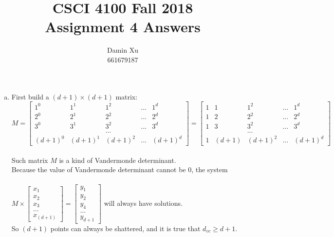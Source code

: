 \documentclass[11pt]{article}
\title{CSCI 4100 Fall 2018 \\
Assignment 4 Answers}
\author{Damin Xu\\661679187}
\begin{document}
\maketitle
\begin{enumerate} [(a)]
	\item First build a $(d+1)\times(d+1)$ matrix:\\
	$M = \begin{bmatrix}
		1^0 & 1^1 & 1^2 & ... & 1^d \\
		2^0 & 2^1 & 2^2 & ... & 2^d \\
		3^0 & 3^1 & 3^2 & ... & 3^d \\
		 &  & ... &  &  \\
		(d+1)^0 & (d+1)^1 & (d+1)^2 & ... & (d+1)^d 
	\end{bmatrix} =
	 \begin{bmatrix}
		1 & 1 & 1^2 & ... & 1^d \\
		1 & 2 & 2^2 & ... & 2^d \\
		1 & 3 & 3^2 & ... & 3^d \\
		 &  & ... &  &  \\
		1 & (d+1) & (d+1)^2 & ... & (d+1)^d 
	\end{bmatrix} $\\\\
	Such matrix $M$ is a kind of Vandermonde determinant.\\
	Because the value of Vandermonde determinant cannot be 0, the system\\\\
	$M\times \begin{bmatrix}
		x_1 \\
		x_2 \\
		x_3 \\
		... \\
		x_{(d+1)} 
	\end{bmatrix}  = \begin{bmatrix}
		y_1 \\
		y_2 \\
		y_4 \\
		... \\
		y_{d+1} 
	\end{bmatrix} $  will always have solutions.\\
	So $(d+1)$ points can always be shattered, and it is true that $d_{vc}\geq d+1$.


\end{enumerate}
\end{document}
